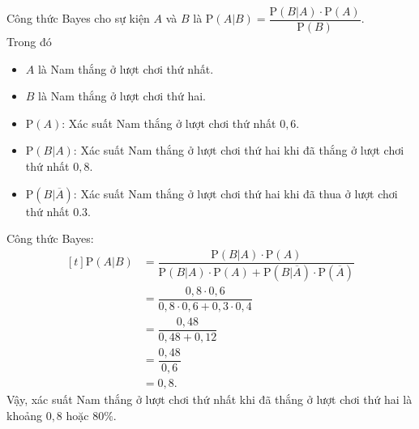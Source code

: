 \begin{bt}
{\begin{listEX}
\begin{center}
			\end{center}
			\item 
			Công thức Bayes cho sự kiện $A$ và $B$ là $\mathrm{P}(A | B)=\dfrac{\mathrm{P}(B | A) \cdot \mathrm{P}(A)}{\mathrm{P}(B)}	$.\\
			Trong đó
			\begin{itemize}
				\item $A$ là Nam thắng ở lượt chơi thứ nhất.
				\item $B$ là Nam thắng ở lượt chơi thứ hai.
				\item $\mathrm{P}(A)$: Xác suất Nam thắng ở lượt chơi thứ nhất $0{,}6$.
				\item $\mathrm{P}(B | A)$: Xác suất Nam thắng ở lượt chơi thứ hai khi đã thắng ở lượt chơi thứ nhất $0{,}8$.
				\item $\mathrm{P}(B | \overline{A})$: Xác suất Nam thắng ở lượt chơi thứ hai khi đã thua ở lượt chơi thứ nhất $0.3$.
			\end{itemize}
			Công thức Bayes:
			$$
			\begin{aligned}[t]
				\mathrm{P}(A | B)&=\dfrac{\mathrm{P}(B | A) \cdot \mathrm{P}(A)}{\mathrm{P}(B | A) \cdot \mathrm{P}(A)+\mathrm{P}(B | \overline{A}) \cdot \mathrm{P}(\overline{A})} \\
				& =\dfrac{0{,}8 \cdot 0{,}6}{0{,}8 \cdot 0{,}6+0{,}3 \cdot 0{,}4} \\
				& = \dfrac{0{,}48}{0{,}48+0{,}12} \\
				& = \dfrac{0{,}48}{0{,}6} \\
				& = 0{,}8.
			\end{aligned}
			$$
			Vậy, xác suất Nam thắng ở lượt chơi thứ nhất khi đã thắng ở lượt chơi thứ hai là khoảng $0{,}8$ hoặc $80 \%$.
		\end{listEX}
	}
\end{bt}

